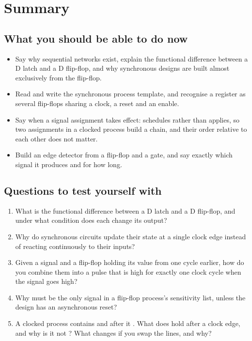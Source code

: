 
\section{Summary}
\label{c3:sec:review}

\subsection*{What you should be able to do now}
\begin{itemize}
  \item Say why sequential networks exist, explain the functional difference between a D latch and
    a D flip-flop, and why synchronous designs are built almost exclusively from the flip-flop.
  \item Read and write the synchronous process template, and recognise a register as several
    flip-flops sharing a clock, a reset and an enable.
  \item Say when a signal assignment takes effect: \code{<=} schedules rather than applies, so two
    assignments in a clocked process build a chain, and their order relative to each other does not
    matter.
  \item Build an edge detector from a flip-flop and a gate, and say exactly which signal it
    produces and for how long.
\end{itemize}

\subsection*{Questions to test yourself with}
\begin{enumerate}
  \item What is the functional difference between a D latch and a D flip-flop, and under what
    condition does each change its output?
  \item Why do synchronous circuits update their state at a single clock edge instead of reacting
    continuously to their inputs?
  \item Given a signal and a flip-flop holding its value from one cycle earlier, how do you combine
    them into a pulse that is high for exactly one clock cycle when the signal goes high?
  \item Why must  be the only signal in a flip-flop process's sensitivity list, unless
    the design has an asynchronous reset?
  \item A clocked process contains  and after it . What does 
    hold after a clock edge, and why is it not ? What changes if you swap the lines, and
    why?
\end{enumerate}

